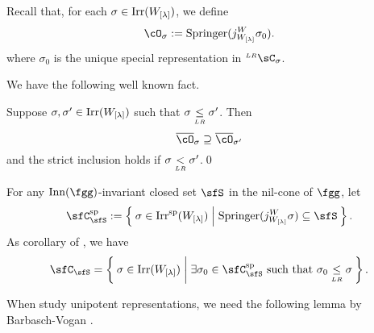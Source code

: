 \documentclass[counting_main.tex]{subfiles}
\begin{document}
Recall that, for each $\sigma\in \mathrm{Irr}(W_{{[\lambda]}})$, we define
\[
  \cO_{\sigma}:= \Spr(j_{\WLam}^{W}\sigma_{0}).
\]
where $\sigma_{0}$ is the unique special representation in $\LRC_{\sigma}$.

We have the following well known fact. %
\begin{lem}\label{lem:LRorbit}
  Suppose $\sigma,\sigma'\in \mathrm{Irr}(W_{[\lambda]})$ such that $\sigma\mathrel{\mathop{\leq}\limits_{\scriptscriptstyle LR}} \sigma'$. Then
  \[
    \bcO_{\sigma} \supseteq \bcO_{\sigma'}
  \]
  and the strict inclusion holds if $\sigma\mathrel{\mathop{<}\limits_{\scriptscriptstyle LR}} \sigma'$.\qed
\end{lem}


  For any $\Gad$-invariant closed set $\sfS$ in the nil-cone of $\fgg$, let
  \begin{equation}\label{eq:C.S}
      \Csp_{\sfS} := \Set{\sigma \in \Irrsp(\WLam)| \Spr(j_{\WLam}^{W}\sigma)\subseteq \sfS}. \\
  \end{equation}
  As  corollary of , we have
\[
  \sfC_{\sfS} = \Set{\sigma\in \Irr(\Wlam)|
    \exists \sigma_{0} \in \Csp_{\sfS}
    \text{ such that } \sigma_{0} \leqLR \sigma}.
\]



When study unipotent representations, we need the following lemma by
Barbasch-Vogan \cite{BVUni}.


\end{document}
